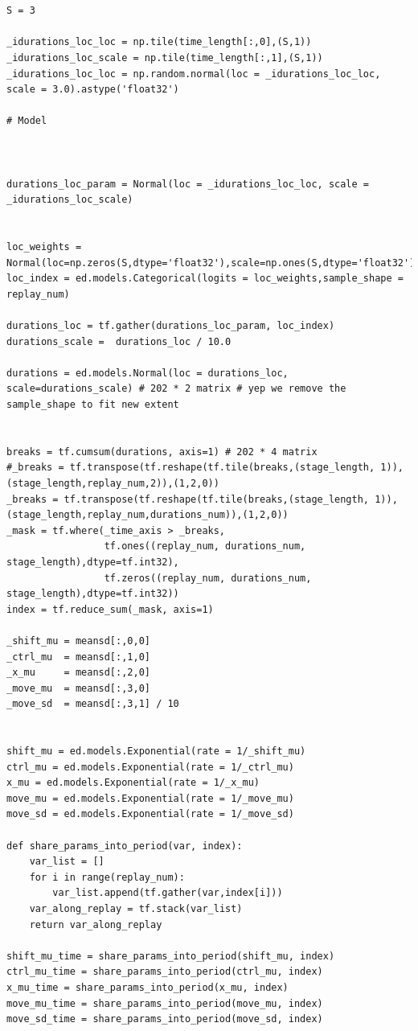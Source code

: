 \documentclass[UTF8]{ctexart}
\begin{document}
\begin{verbatim}


S = 3

_idurations_loc_loc = np.tile(time_length[:,0],(S,1))
_idurations_loc_scale = np.tile(time_length[:,1],(S,1))
_idurations_loc_loc = np.random.normal(loc = _idurations_loc_loc, scale = 3.0).astype('float32')

# Model



durations_loc_param = Normal(loc = _idurations_loc_loc, scale = _idurations_loc_scale) 


loc_weights = Normal(loc=np.zeros(S,dtype='float32'),scale=np.ones(S,dtype='float32'))
loc_index = ed.models.Categorical(logits = loc_weights,sample_shape = replay_num)

durations_loc = tf.gather(durations_loc_param, loc_index) 
durations_scale =  durations_loc / 10.0 

durations = ed.models.Normal(loc = durations_loc, scale=durations_scale) # 202 * 2 matrix # yep we remove the sample_shape to fit new extent


breaks = tf.cumsum(durations, axis=1) # 202 * 4 matrix
#_breaks = tf.transpose(tf.reshape(tf.tile(breaks,(stage_length, 1)),(stage_length,replay_num,2)),(1,2,0))  
_breaks = tf.transpose(tf.reshape(tf.tile(breaks,(stage_length, 1)),(stage_length,replay_num,durations_num)),(1,2,0))  
_mask = tf.where(_time_axis > _breaks, 
                 tf.ones((replay_num, durations_num, stage_length),dtype=tf.int32), 
                 tf.zeros((replay_num, durations_num, stage_length),dtype=tf.int32))
index = tf.reduce_sum(_mask, axis=1)

_shift_mu = meansd[:,0,0]
_ctrl_mu  = meansd[:,1,0]
_x_mu     = meansd[:,2,0]
_move_mu  = meansd[:,3,0]
_move_sd  = meansd[:,3,1] / 10


shift_mu = ed.models.Exponential(rate = 1/_shift_mu)
ctrl_mu = ed.models.Exponential(rate = 1/_ctrl_mu)
x_mu = ed.models.Exponential(rate = 1/_x_mu)
move_mu = ed.models.Exponential(rate = 1/_move_mu) 
move_sd = ed.models.Exponential(rate = 1/_move_sd) 

def share_params_into_period(var, index):
    var_list = []
    for i in range(replay_num):
        var_list.append(tf.gather(var,index[i]))
    var_along_replay = tf.stack(var_list)
    return var_along_replay

shift_mu_time = share_params_into_period(shift_mu, index)
ctrl_mu_time = share_params_into_period(ctrl_mu, index)
x_mu_time = share_params_into_period(x_mu, index)
move_mu_time = share_params_into_period(move_mu, index)
move_sd_time = share_params_into_period(move_sd, index)


\end{verbatim}
\end{document}
